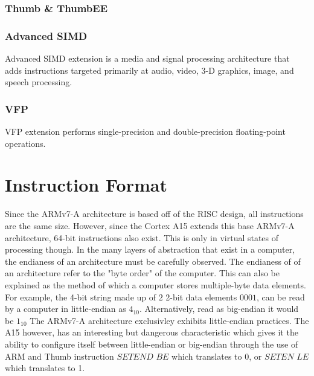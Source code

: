 \documentclass[12pt]{scrreprt}
\begin{document}
		\subsection{Thumb \& ThumbEE}



		\subsection{Advanced SIMD}

		Advanced SIMD extension is a media and signal processing architecture that adds instructions targeted primarily at audio, video, 3-D 
		graphics, image, and speech processing.
		
		\subsection{VFP}
		VFP extension performs single-precision and double-precision floating-point operations.
	

{\let\clearpage\relax\chapter{Instruction Format}}

	Since the ARMv7-A architecture is based off of the RISC design, all instructions are the same size. However, since the Cortex A15 extends
	this base ARMv7-A architecture, 64-bit instructions also exist. This is only in virtual states of processing though.
	In the many layers of abstraction that exist in a computer, the endianess of an architecture must be carefully observed. The endianess of
	of an architecture refer to the "byte order" of the computer. This can also be explained as the method of which a computer stores
	multiple-byte data elements. For example, the 4-bit string made up of $2$ 2-bit data elements $0001$, can be read by a computer in little-endian as $4_{10}$. Alternatively, read as big-endian it would be $1_{10}$ The ARMv7-A architecture exclusivley exhibits little-endian practices. The A15 however, has an interesting but dangerous characteristic which gives it the ability to configure itself between little-endian or big-endian through the use of ARM and Thumb instruction $SETEND$ $BE$ which translates to 0, or $SETEN$ $LE$ which translates to 1.
\end{document}
